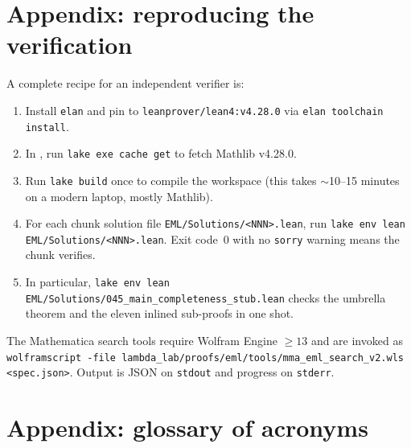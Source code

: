 \documentclass[11pt,a4paper]{article}
\theoremstyle{plain}
\theoremstyle{definition}
\begin{document}
\section{Appendix: reproducing the verification}\label{app:repro}

A complete recipe for an independent verifier is:

\begin{enumerate}[leftmargin=*]
\item Install \texttt{elan} and pin to
\texttt{leanprover/lean4:v4.28.0} via \texttt{elan toolchain install}.
\item In , run
\texttt{lake exe cache get} to fetch Mathlib v4.28.0.
\item Run \texttt{lake build} once to compile the workspace
(this takes $\sim$10--15 minutes on a modern laptop, mostly
Mathlib).
\item For each chunk solution file
\texttt{EML/Solutions/<NNN>.lean}, run
\texttt{lake env lean EML/Solutions/<NNN>.lean}.  Exit code~0 with no
\texttt{sorry} warning means the chunk verifies.
\item In particular,
\texttt{lake env lean EML/Solutions/045\_main\_completeness\_stub.lean}
checks the umbrella theorem and the eleven inlined sub-proofs in one
shot.
\end{enumerate}

The Mathematica search tools require Wolfram Engine $\ge 13$ and are
invoked as
\texttt{wolframscript -file lambda\_lab/proofs/eml/tools/mma\_eml\_search\_v2.wls
<spec.json>}.  Output is JSON on \texttt{stdout} and progress on
\texttt{stderr}.

\section{Appendix: glossary of acronyms}\label{app:glossary}
\end{document}
